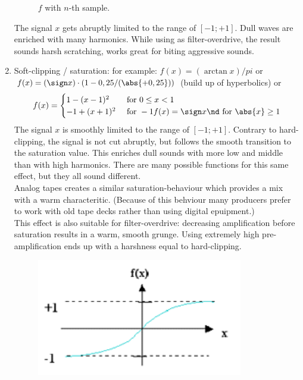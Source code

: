 \begin{example}
\begin{enumerate}
\begin{figure}[ht!]
			\caption{$f$ with $n$-th sample.}
			\label{hard_clip_sample}
		\end{figure}
	The signal $x$ gets abruptly limited to the range of $[-1;+1]$. Dull waves are enriched with many harmonics. While using as filter-overdrive, the result sounds harsh scratching, works great for biting aggressive sounds.
	\item Soft-clipping / saturation: for example: $f(x)=(\arctan x)/pi$
	or $f(x)=(\sign x) \cdot (1-0,25/(\abs{+0,25}))$ (build up of hyperbolics) or
	\begin{align*}
		f(x) = \begin{cases}
			1-(x-1)^2 &\for 0\leq x < 1\\
			-1+(x+1)^2 &\for -1 f(x)=\sign x \nd \for \abs{x}\geq 1
		\end{cases}
	\end{align*}
	The signal $x$ is smoothly limited to the range of $[-1;+1]$. Contrary to hard-clipping, the signal is not cut abruptly, but follows the smooth transition to the saturation value. This enriches dull sounds with more low and middle than with high harmonics. There are many possible functions for this same effect, but they all sound different.\\
	Analog tapes creates a similar saturation-behaviour which provides a mix with a warm characteritic. (Because of this behviour many producers prefer to work with old tape decks rather than using digital epuipment.)\\
	This effect is also suitable for filter-overdrive: decreasing amplification before saturation results in a warm, smooth grunge. Using extremely high pre-amplification ends up with a harshness equal to hard-clipping.
	\bigskip %
	\begin{figure}[ht!]
		\centering
		\includegraphics[width=90mm]{pics/soft_clip_1.png}

\end{figure}
\end{enumerate}
\end{example}
